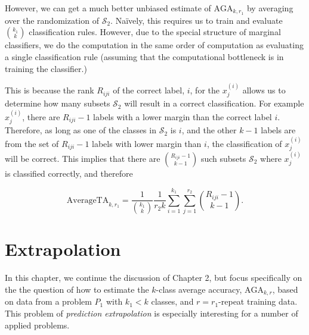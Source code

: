 \documentclass[12pt]{article}
\begin{document}
However, we can get a much better unbiased estimate of
$\text{AGA}_{k, r_1}$ by averaging over the randomization of
$\mathcal{S}_2$.  Na\"{i}vely, this requires us to train and evaluate
${k_1}\choose{k}$ classification rules.  However, due to the special
structure of marginal classifiers, we do the computation in the same
order of computation as evaluating a single classification rule
(assuming that the computational bottleneck is in training the
classifier.)

This is because the rank $R_{iji}$ of the correct label, $i$, for the
$x_j^{(i)}$ allows us to determine how many subsets $\mathcal{S}_2$
will result in a correct classification.  For example $x_j^{(i)}$,
there are $R_{iji} - 1$ labels with a lower margin than the correct
label $i$.  Therefore, as long as one of the classes in
$\mathcal{S}_2$ is $i$, and the other $k-1$ labels are from the set of
$R_{iji}-1$ labels with lower margin than $i$, the classification of
$x_j^{(i)}$ will be correct.  This implies that there are
${R_{iji}-1}\choose{k-1}$ such subsets $\mathcal{S}_2$ where
$x_j^{(i)}$ is classified correctly, and therefore

\begin{equation}\label{eq:avtestrisk}
\text{AverageTA}_{k, r_1} = \frac{1}{{{k_1}\choose{k}}}\frac{1}{r_2 k} \sum_{i=1}^{k_1} \sum_{j=1}^{r_2} {{R_{iji}-1}\choose{k-1}}.
\end{equation}

\section{Extrapolation}

In this chapter, we continue the discussion of Chapter 2, but focus
specifically on the the question of how to estimate the $k$-class
average accuracy, $\text{AGA}_{k, r}$, based on data from a problem
$P_1$ with $k_1 < k$ classes, and $r = r_1$-repeat training data.
This problem of \emph{prediction extrapolation} is especially
interesting for a number of applied problems.
\end{document}
